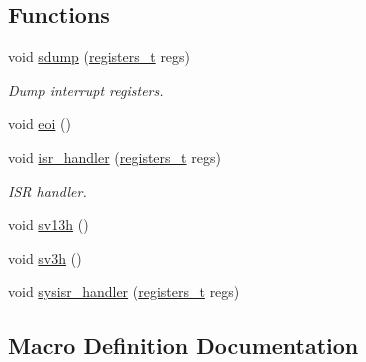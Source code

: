 \subsection*{Functions}
\begin{DoxyCompactItemize}
\item 
void \hyperlink{a00113_a4b4233daef6e041e7278cae2b21b5ed4_a4b4233daef6e041e7278cae2b21b5ed4}{sdump} (\hyperlink{a00140_adf58dbaf6139b4957c348711f2026957_adf58dbaf6139b4957c348711f2026957}{registers\+\_\+t} regs)
\begin{DoxyCompactList}\small\item\em Dump interrupt registers. \end{DoxyCompactList}\item 
void \hyperlink{a00113_a4af3b3eec03921259f5db474506c0c8d_a4af3b3eec03921259f5db474506c0c8d}{eoi} ()
\item 
void \hyperlink{a00113_a700e3ca056bf69296370f504f2cb6cc8_a700e3ca056bf69296370f504f2cb6cc8}{isr\+\_\+handler} (\hyperlink{a00140_adf58dbaf6139b4957c348711f2026957_adf58dbaf6139b4957c348711f2026957}{registers\+\_\+t} regs)
\begin{DoxyCompactList}\small\item\em I\+SR handler. \end{DoxyCompactList}\item 
void \hyperlink{a00113_aeeac7331d1a449871656eeb6ac73fd25_aeeac7331d1a449871656eeb6ac73fd25}{sv13h} ()
\item 
void \hyperlink{a00113_ad118f86f4af40a3b4b94bc7c4977e762_ad118f86f4af40a3b4b94bc7c4977e762}{sv3h} ()
\item 
void \hyperlink{a00113_abd1fa375737cd5ecd84c082738e3b195_abd1fa375737cd5ecd84c082738e3b195}{sysisr\+\_\+handler} (\hyperlink{a00140_adf58dbaf6139b4957c348711f2026957_adf58dbaf6139b4957c348711f2026957}{registers\+\_\+t} regs)
\end{DoxyCompactItemize}


\subsection{Macro Definition Documentation}
\mbox{\label{a00113_a1a50e87666fd36809857ecdf02ec1e0e_a1a50e87666fd36809857ecdf02ec1e0e}} 
